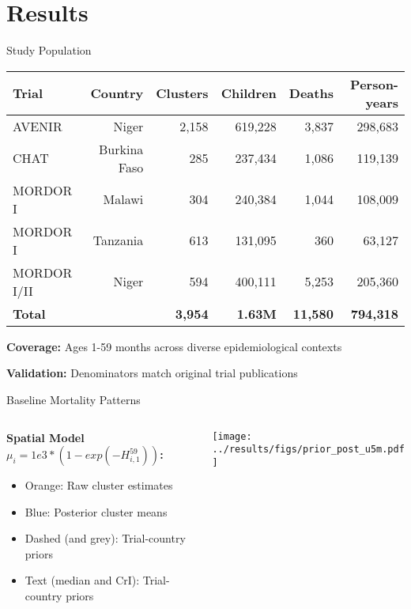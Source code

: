 \documentclass[aspectratio=169]{beamer}\usepackage[]{graphicx}\usepackage[dvipsnames]{xcolor}
\begin{document}
\section{Results}

\begin{frame}{Study Population}
\begin{center}
\begin{tabular}{lrrrrr}
\toprule
Trial & Country & Clusters & Children & Deaths & Person-years \\
\midrule
AVENIR & Niger & 2,158 & 619,228 & 3,837 & 298,683 \\
CHAT & Burkina Faso & 285 & 237,434 & 1,086 & 119,139 \\
MORDOR I & Malawi & 304 & 240,384 & 1,044 & 108,009 \\
MORDOR I & Tanzania & 613 & 131,095 & 360 & 63,127 \\
MORDOR I/II & Niger & 594 & 400,111 & 5,253 & 205,360 \\
\midrule
\textbf{Total} & & \textbf{3,954} & \textbf{1.63M} & \textbf{11,580} & \textbf{794,318} \\
\bottomrule
\end{tabular}
\end{center}

\vspace{0.5cm}
\textbf{Coverage:} Ages 1-59 months across diverse epidemiological contexts

\textbf{Validation:} Denominators match original trial publications
\end{frame}

\begin{frame}{Baseline Mortality Patterns}
\begin{columns}
\begin{column}{0.4\textwidth}
\textbf{Spatial Model $\mu_i = 1e3*(1 - exp(-H_{i,1}^{59}))$:}
\begin{itemize}
  \item Orange: Raw cluster estimates 
  \item Blue: Posterior cluster means
  \item Dashed (and grey): Trial-country priors
  \item Text (median and CrI): Trial-country priors
\end{itemize}
\end{column}
\begin{column}{0.6\textwidth}
\begin{center}
\texttt{[image: ../results/figs/prior\_post\_u5m.pdf]}
\end{center}
\end{column}
\end{columns}
\end{frame}
\end{document}
